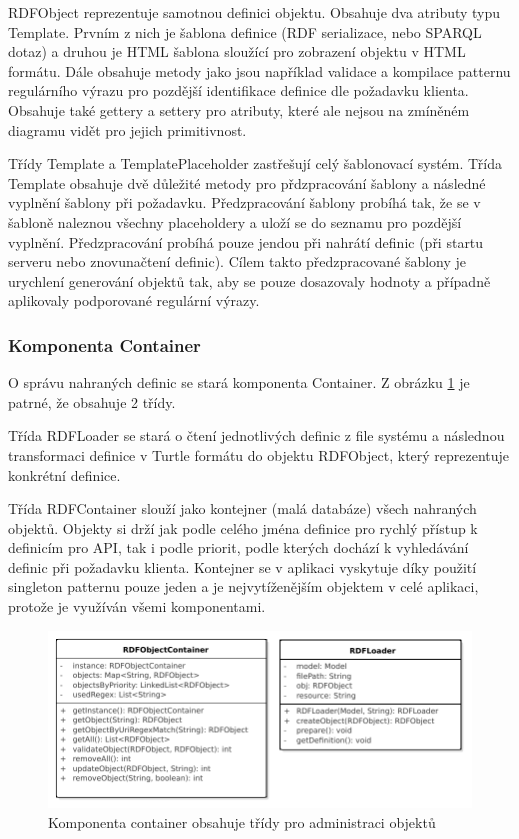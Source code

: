 \documentclass[thesis=B,czech]{FITthesis}[2012/06/26]
\begin{document}
    RDFObject reprezentuje samotnou definici objektu. Obsahuje dva atributy typu Template. Prvním z nich je šablona definice (RDF serializace, nebo SPARQL dotaz) a
    druhou je HTML šablona sloužící pro zobrazení objektu v HTML formátu. Dále obsahuje metody jako jsou například validace a kompilace patternu
    regulárního výrazu pro pozdější identifikace definice dle požadavku klienta. Obsahuje také gettery a settery pro atributy, které ale nejsou
    na zmíněném diagramu vidět pro jejich primitivnost.
    
    Třídy Template a TemplatePlaceholder zastřešují celý šablonovací systém. Třída Template obsahuje dvě důležité metody pro přdzpracování šablony
    a následné vyplnění šablony při požadavku. Předzpracování šablony probíhá tak, že se v šabloně naleznou všechny placeholdery a uloží se do seznamu
    pro pozdější vyplnění. Předzpracování probíhá pouze jendou při nahrátí definic (při startu serveru nebo znovunačtení definic). Cílem takto
    předzpracované šablony je urychlení generování objektů tak, aby se pouze dosazovaly hodnoty a případně aplikovaly podporované regulární výrazy.
 
 \subsubsection{Komponenta Container}
 O správu nahraných definic se stará komponenta Container. Z obrázku \ref{container_class} je patrné, že obsahuje 2 třídy.
 
 Třída RDFLoader se stará
 o čtení jednotlivých definic z file systému a následnou transformaci definice v Turtle formátu do objektu RDFObject,
 který reprezentuje konkrétní definice.
 
 Třída RDFContainer slouží jako kontejner (malá databáze) všech nahraných objektů. Objekty si drží jak podle celého jména definice pro rychlý přístup
 k definicím pro API, tak i podle priorit, podle kterých dochází k vyhledávání definic při požadavku klienta.
 Kontejner se v aplikaci vyskytuje díky použití singleton patternu
 pouze jeden a je nejvytíženějším objektem v celé aplikaci, protože je využíván všemi komponentami.
 
 \begin{figure}\centering
 	\includegraphics[width=\textwidth]{Container.pdf}
 	\caption[Model tříd komponenty container]{Komponenta container obsahuje třídy pro administraci objektů}\label{container_class}
    \end{figure}
    
\end{document}
